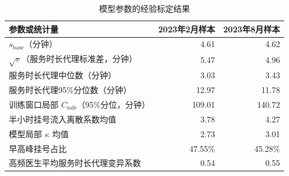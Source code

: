 \begin{table}[H]
\centering
\small
\caption{模型参数的经验标定结果}
\label{tab:parameter-calibration}
\begin{tabular}{lrr}
\toprule
参数或统计量 & 2023年2月样本 & 2023年8月样本 \\
\midrule
$s_{\mathrm{base}}$（分钟） & 4.61 & 4.62 \\
$\sqrt{v}$（服务时长代理标准差，分钟） & 5.47 & 4.96 \\
服务时长代理中位数（分钟） & 3.03 & 3.43 \\
服务时长代理95\%分位数（分钟） & 12.97 & 11.78 \\
训练窗口局部 $C_{\mathrm{safe}}$（95\%分位，分钟） & 109.01 & 140.72 \\
半小时挂号流入离散系数均值 & 3.78 & 4.27 \\
模型局部 $\kappa$ 均值 & 2.73 & 3.01 \\
早高峰挂号占比 & 47.55\% & 45.28\% \\
高频医生平均服务时长代理变异系数 & 0.54 & 0.55 \\
\bottomrule
\end{tabular}
\end{table}
